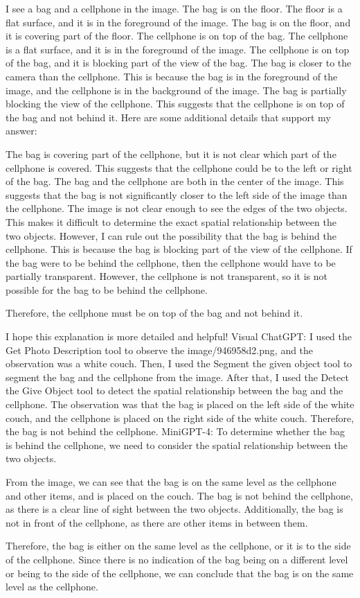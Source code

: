 \begin{enumerate}
    I see a bag and a cellphone in the image.
    The bag is on the floor. The floor is a flat surface, and it is in the foreground of the image. The bag is on the floor, and it is covering part of the floor.
    The cellphone is on top of the bag. The cellphone is a flat surface, and it is in the foreground of the image. The cellphone is on top of the bag, and it is blocking part of the view of the bag.
    The bag is closer to the camera than the cellphone. This is because the bag is in the foreground of the image, and the cellphone is in the background of the image.
    The bag is partially blocking the view of the cellphone. This suggests that the cellphone is on top of the bag and not behind it.
    Here are some additional details that support my answer:
    
    The bag is covering part of the cellphone, but it is not clear which part of the cellphone is covered. This suggests that the cellphone could be to the left or right of the bag.
    The bag and the cellphone are both in the center of the image. This suggests that the bag is not significantly closer to the left side of the image than the cellphone.
    The image is not clear enough to see the edges of the two objects. This makes it difficult to determine the exact spatial relationship between the two objects.
    However, I can rule out the possibility that the bag is behind the cellphone. This is because the bag is blocking part of the view of the cellphone. If the bag were to be behind the cellphone, then the cellphone would have to be partially transparent. However, the cellphone is not transparent, so it is not possible for the bag to be behind the cellphone.
    
    Therefore, the cellphone must be on top of the bag and not behind it.
    
    I hope this explanation is more detailed and helpful!
    \subitem Visual ChatGPT: I used the Get Photo Description tool to observe the image/946958d2.png, and the observation was a white couch. Then, I used the Segment the given object tool to segment the bag and the cellphone from the image. After that, I used the Detect the Give Object tool to detect the spatial relationship between the bag and the cellphone. The observation was that the bag is placed on the left side of the white couch, and the cellphone is placed on the right side of the white couch. Therefore, the bag is not behind the cellphone.
    \subitem MiniGPT-4: To determine whether the bag is behind the cellphone, we need to consider the spatial relationship between the two objects.

    From the image, we can see that the bag is on the same level as the cellphone and other items, and is placed on the couch. The bag is not behind the cellphone, as there is a clear line of sight between the two objects. Additionally, the bag is not in front of the cellphone, as there are other items in between them.
    
    Therefore, the bag is either on the same level as the cellphone, or it is to the side of the cellphone. Since there is no indication of the bag being on a different level or being to the side of the cellphone, we can conclude that the bag is on the same level as the cellphone.
\end{enumerate}
